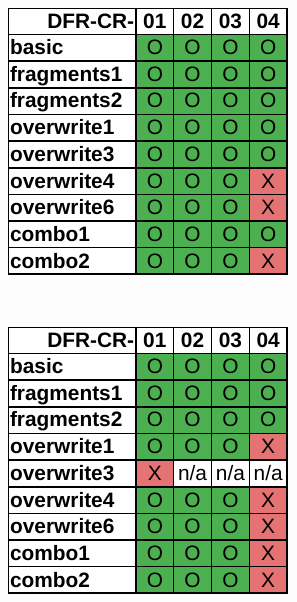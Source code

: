 \begin{figure}
\begin{subfigure}{0.3\linewidth}
    \end{subfigure}
    \begin{subfigure}{0.3\linewidth}
        \includegraphics[width=\linewidth]{fig/ftk_results_ntfs.pdf}
    \end{subfigure}~~
    \begin{subfigure}{0.3\linewidth}
        \includegraphics[width=\linewidth]{fig/testdisk_results_ntfs.pdf}

\end{subfigure}
\end{figure}
